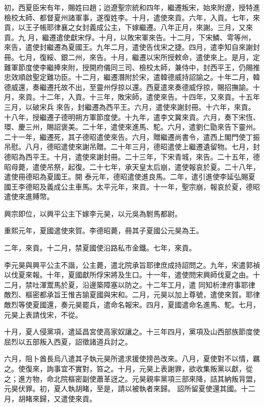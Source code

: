 \begin{pinyinscope}
 初，西夏臣宋有年，賜姓曰趙；迨遼聖宗統和四年，繼遷叛宋，始來附遼，授特進檢校太師、都督夏州諸軍事，遂復姓李。十月，遣使來貢。六年，入貢。七年，來貢，以王子帳耶律襄之女封義成公主，下嫁繼遷。八年正月，來謝。三月，又來貢。九
 月，繼遷遣使獻宋俘。十月，以敗宋軍來告。十二月，下宋鱗、雩等州，來告，遣使封繼遷為夏國王。九年二月，遣使告伐宋之捷。四月，遣李知自來謝封冊。七月，復綏、銀二州，來告。十月，繼遷以宋所授敕命，遣使來上。是月，定難軍節度使李繼捧來附，授開府儀同三司、檢校太師，兼侍中，封西平王，仍賜推忠效順啟聖定難功臣。十二月，繼遷潛附於宋，遣韓德威持詔諭之。十年二月，韓德威還，奏繼遷托故不出，至靈州俘掠以還。西夏遣來奏德威俘掠，賜招撫諭。十月，來貢。十二年，入貢。十三年，敗宋師，遣使來告。十四年，又來貢。十五年三月，以破宋兵
 來告，封繼遷為西平王。六月，遣使來謝封冊。十六年，來貢。十八年，授繼遷子德明朔方軍節度使。十九年，遣李文冀來貢。六月，奏下宋恆、環、慶三州，賜詔褒美。二十年，遣使來進馬、駝。六月，遣劉仁勖來告下靈州。二十一年，繼遷死，其子德昭遣使來告。六月，贈繼遷尚書令，遣西上閣門使丁振吊慰。八月，德昭遣使來謝吊贈。二十年三月，德昭遣使上繼遷遺留物。七月，封德昭為西平王。十月，遣使來謝封冊。二十三年，下宋青城，來告。二十五年，德昭母薨，遣使吊祭，起復。二十七年，承天皇太后崩，遣使報哀於夏。二十八年，遣使冊德昭為夏國王。開
 泰元年，德昭遣使進良馬。二年，遣引進使李延弘賜夏國王李德昭及義成公主車馬。太平元年，來貢。十一年，聖宗崩，報哀於夏，德昭遣使來進賻幣。



 興宗即位，以興平公主下嫁李元昊，以元吳為駙馬都尉。



 重熙元年，夏國遣使來賀。李德昭薨，冊其子夏國公元昊為王。



 二年，來貢。十二月，禁夏國使沿路私市金鐵。七年，來貢。



 李元昊與興平公主不諧，公主薨，遣北院承旨耶律庶成持詔問之。九年，宋遣郭禎以伐夏來報。十年，夏國獻所俘宋將及生口。十一年，遣使問宋興師伐夏之由。十二月，禁吐渾鬻馬於夏，沿邊築障塞以防之。十二年工月，遣
 同知析津府事耶律敵烈、樞密都承旨王惟吉諭夏國與宋和。二月，元昊以加上尊號，遣使來賀。耶律敵烈等使夏國還，奏元昊罷兵，遣命名報宋。四月，夏國遣命名進馬、駝。七月，元昊上表請伐宋，不從。



 十月，夏人侵黨項，遣延昌宮使高家奴讓之。十三年四月，黨項及山西部族節度使屈烈以五部叛入西夏，詔徵諸道兵討之。



 六月，阻卜酋長烏八遣其子執元昊所遣求援使搒邑改來。八月，夏使對不以情，羈之。使復來，詢事宜不實對，笞之。十月，元昊上表謝罪，欲收集叛黨以獻，從之；進方物，命北院樞密副使蕭革迓之。元昊親率黨項三部來降，詰其納叛背盟，元昊伏罪。初，夏人執胡睹，至是，請以被執者來歸。
 詔所留夏使還其國。十二月，胡睹來歸，又遣使來貢。




\end{pinyinscope}
